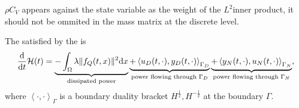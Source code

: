 \documentclass[letterpaper,10pt,english]{sphinxmanual}
\begin{document}
\sphinxAtStartPar
{} \(\rho C_V\) appears against the state variable as the
weight of the \(L^2\)\sphinxhyphen{}inner product, it should not be ommited in the
mass matrix at the discrete level.

\sphinxAtStartPar
The  satisfied by the  is
\begin{equation*}
\begin{split}\frac{\rm d}{{\rm d}t} \mathcal{H}(t) = \underbrace{- \int_\Omega \lambda \| f_Q(t,x) \|^2 {\rm d} x}_{\text{dissipated power}} \underbrace{+ \left\langle u_D(t,\cdot), y_D(t,\cdot) \right\rangle_{\Gamma_D}}_{\text{power flowing through }\Gamma_D} \underbrace{+ \left\langle y_N(t,\cdot), u_N(t,\cdot)\right\rangle_{\Gamma_N}}_{\text{power flowing through }\Gamma_N},\end{split}
\end{equation*}
\sphinxAtStartPar
where \(\left\langle \cdot, \cdot \right\rangle_{\Gamma}\) is a
boundary duality bracket \(H^\frac12, H^{-\frac12}\) at the boundary
\(\Gamma\).
\end{document}
